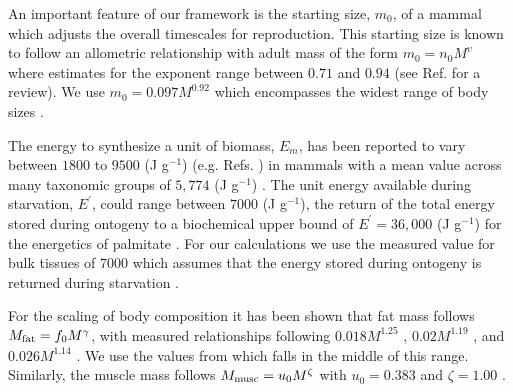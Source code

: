 \documentclass[twocolumn,preprintnumbers,amsmath,amssymb,superscriptaddress]{revtex4}
\begin{document}
\begin{bibunit}[unsrt]
An important feature of our framework is the starting size, $m_{0}$, of a mammal which adjusts the overall timescales for reproduction. This starting size is known to follow an allometric relationship with adult mass of the form $m_{0}=n_{0}M^{\upsilon}$ where estimates for the exponent range between $0.71$ and $0.94$ (see Ref. \citep{peters1986ecological} for a review). We use $m_{0}=0.097M^{0.92}$ \citep{blueweiss1978relationships} which encompasses the widest range of body sizes \citep{peters1986ecological}.

The energy to synthesize a unit of biomass, $E_{m}$, has been reported to vary between $1800$ to $9500$ (J g$^{-1}$) (e.g. Refs. \citep{West:2001bv,moses2008rmo,hou}) in mammals with a mean value across many taxonomic groups of $5,774$ (J g$^{-1}$) \citep{moses2008rmo}. The unit energy available during starvation, $E^{\prime}$, could range between $7000$ (J g$^{-1}$), the return of the total energy stored during ontogeny \citep{hou} to a biochemical upper bound of $E^{\prime}=36,000$ (J g$^{-1}$) for the energetics of palmitate \citep{stryer,hou}. For our calculations we use the measured value for bulk tissues of $7000$ which assumes that the energy stored during ontogeny is returned during starvation \citep{hou}.

For the scaling of body composition it has been shown that fat mass follows $M_{\rm fat}=f_{0}M^{\gamma}$, with measured  relationships following  $0.018M^{1.25}$ \citep{Dunbrack:1993ec}, $0.02M^{1.19}$ \citep{Lindstedt:1985hm}, and $0.026M^{1.14}$ \citep{Lindstedt:2002td}. We use the values from \citep{Lindstedt:1985hm} which falls in the middle of this range. Similarly, the muscle mass follows $M_{\rm musc}=u_{0}M^{\zeta}$ with $u_{0}=0.383$ and $\zeta=1.00$ \citep{Lindstedt:2002td}.



\end{bibunit}
\end{document}
